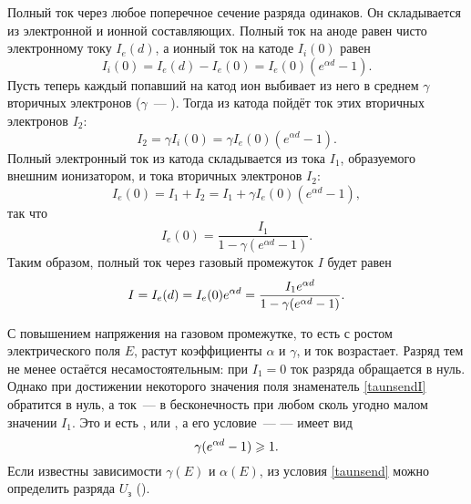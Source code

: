 Полный ток через любое поперечное сечение разряда одинаков.
Он складывается из электронной и ионной составляющих.
Полный ток на аноде равен чисто электронному току $I_e(d)$,
а ионный ток на катоде $I_i(0)$ равен
\begin{equation*}
	I_i(0)=I_e(d)-I_e(0)=I_e(0)(e^{\alpha d}-1).
\end{equation*}
Пусть теперь каждый попавший на катод ион выбивает из него в среднем
$\gamma$ вторичных электронов
($\gamma$~--- ).
Тогда из катода пойдёт ток этих вторичных электронов $I_2$:
\begin{equation*}
	I_2=\gamma I_i(0)=\gamma I_e(0)(e^{\alpha d}-1).
\end{equation*}
Полный электронный ток из катода складывается из тока $I_1$,
образуемого внешним ионизатором, и тока вторичных электронов $I_2$:
\begin{equation*}
	I_e(0)=I_1+I_2=I_1+\gamma I_e(0)(e^{\alpha d}-1),
\end{equation*}
так что
\begin{equation*}
	I_e(0)=\frac{I_1}{1-\gamma(e^{\alpha d}-1)}.
\end{equation*}
Таким образом, полный ток через газовый промежуток $I$ будет равен
\begin{equation}
    \eqmark{taunsendI}
	I=I_e(d)=I_e(0)e^{\alpha d}=\frac{I_1e^{\alpha d}}{1-\gamma(e^{\alpha
d}-1)}.
\end{equation}

С повышением напряжения на газовом промежутке, то есть с ростом электрического
поля $E$, растут коэффициенты $\alpha$ и $\gamma$, и ток возрастает.
Разряд тем не менее остаётся несамостоятельным: при $I_1=0$ ток разряда
обращается в нуль. Однако при достижении некоторого значения поля
знаменатель \eqref{taunsendI} обратится в нуль,
а ток~--- в бесконечность при любом сколь угодно малом значении $I_1$.
Это и есть , или , а его
условие~---  --- имеет вид
\begin{equation}
    \eqmark{taunsend}
	\gamma(e^{\alpha d}-1)\ge 1.
\end{equation}
Если известны зависимости $\gamma(E)$ и $\alpha(E)$, из условия \eqref{taunsend}
можно определить  разряда $U_{з}$
().

